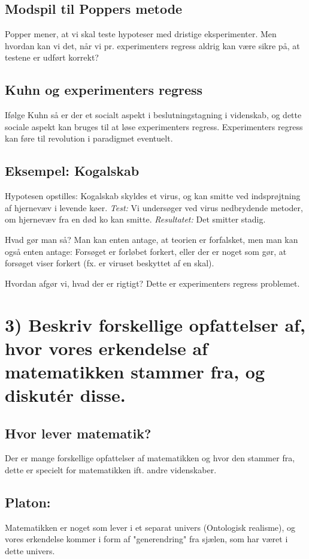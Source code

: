 \documentclass[a4paper,oneside,12pt]{memoir}
\begin{document}
\subsection{Modspil til Poppers metode}
Popper mener, at vi skal teste hypoteser med dristige eksperimenter. Men hvordan kan vi det, når vi pr. experimenters regress aldrig kan være sikre på, at testene er udført korrekt?

\subsection{Kuhn og experimenters regress}
Ifølge Kuhn så er der et socialt aspekt i beslutningstagning i videnskab, og dette sociale aspekt kan bruges til at løse experimenters regress. Experimenters regress kan føre til revolution i paradigmet eventuelt.

\subsection{Eksempel: Kogalskab}
Hypotesen opstilles: Kogalskab skyldes et virus, og kan smitte ved indsprøjtning af hjernevæv i levende køer. \textit{Test:} Vi undersøger ved virus nedbrydende metoder, om hjernevæv fra en død ko kan smitte. \textit{Resultatet:} Det smitter stadig.

Hvad gør man så? Man kan enten antage, at teorien er forfalsket, men man kan også enten antage: Forsøget er forløbet forkert, eller der er noget som gør, at forsøget viser forkert (fx. er viruset beskyttet af en skal).

Hvordan afgør vi, hvad der er rigtigt? Dette er experimenters regress problemet.

\newpage
\section{3) Beskriv forskellige opfattelser af, hvor vores erkendelse af matematikken stammer fra, og diskutér disse.}
\subsection{Hvor lever matematik?}
Der er mange forskellige opfattelser af matematikken og hvor den stammer fra, dette er specielt for matematikken ift. andre videnskaber.

\subsection{Platon:}
Matematikken er noget som lever i et separat univers (Ontologisk realisme), og vores erkendelse kommer i form af "generendring" fra sjælen, som har været i dette univers. 
\end{document}

